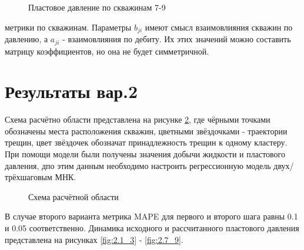 \documentclass[14pt]{article}
\begin{document}
\begin{figure}
	\caption{Пластовое давление по скважинам 7-9}
	\label{fig:1.7_9}
\end{figure}
метрики по скважинам. Параметры $b_{ji}$ имеют смысл взаимовлияния скважин по давлению, а $a_{ji}$ - взаимовлияния по дебиту. Их этих значений можно составить матрицу коэффициентов, но она не будет симметричной.

	\section{Результаты вар.2}
	Схема расчётно области представлена на рисунке \ref{fig:init_model}, где чёрными точками обозначены места расположения скважин, цветными звёздочками - траектории трещин, цвет звёздочек обозначат принадлежность трещин к одному кластеру.
	При помощи модели были получены значения добычи жидкости и пластового давления, дпо этим данным необходимо настроить регрессионную модель двух/трёхшаговым МНК.
	\begin{figure}
		\caption{Схема расчётной области}
		\label{fig:init_model}
	\end{figure}
	В случае второго варианта метрика MAPE для первого и второго шага равны 0.1 и 0.05 соответственно. Динамика исходного и рассчитанного пластового давления представлена на рисунках \ref{fig:2.1_3} - \ref{fig:2.7_9}.
	
\end{document}
